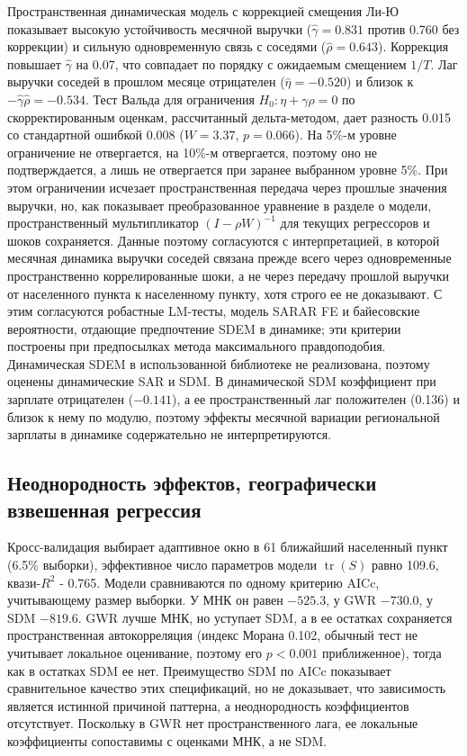 \documentclass[12pt, a4paper]{article}
\begin{document}
Пространственная динамическая модель с коррекцией смещения Ли-Ю показывает высокую устойчивость
месячной выручки ($\hat{\gamma} = 0.831$ против 0.760 без коррекции) и сильную одновременную
связь с соседями ($\hat{\rho} = 0.643$). Коррекция повышает $\hat{\gamma}$ на 0.07, что совпадает
по порядку с ожидаемым смещением $1/T$. Лаг выручки соседей в прошлом месяце отрицателен
($\hat{\eta} = -0.520$) и близок к $-\hat{\gamma} \hat{\rho} = -0.534$. Тест Вальда для
ограничения $H_0: \eta + \gamma \rho = 0$ по скорректированным оценкам, рассчитанный
дельта-методом, дает разность 0.015 со стандартной ошибкой 0.008 ($W = 3.37$, $p = 0.066$). На
5\%-м уровне ограничение не отвергается, на 10\%-м отвергается, поэтому оно не подтверждается, а
лишь не отвергается при заранее выбранном уровне 5\%. При этом ограничении исчезает пространственная
передача через прошлые значения выручки, но, как показывает преобразованное уравнение в разделе
о модели, пространственный мультипликатор $(I - \rho W)^{-1}$ для текущих регрессоров и шоков
сохраняется. Данные поэтому согласуются с интерпретацией, в которой месячная динамика выручки
соседей связана прежде всего через одновременные пространственно коррелированные шоки, а не через
передачу прошлой выручки от населенного пункта к населенному пункту, хотя строго ее не доказывают. С этим согласуются
робастные LM-тесты, модель SARAR FE и байесовские вероятности, отдающие предпочтение SDEM в
динамике; эти критерии построены при предпосылках метода максимального правдоподобия. Динамическая
SDEM в использованной библиотеке не реализована, поэтому оценены динамические SAR и SDM. В
динамической SDM коэффициент при зарплате отрицателен ($-0.141$), а ее пространственный лаг
положителен (0.136) и близок к нему по модулю, поэтому эффекты месячной вариации региональной
зарплаты в динамике содержательно не интерпретируются.

\subsection*{Неоднородность эффектов, географически взвешенная регрессия}

Кросс-валидация выбирает адаптивное окно в 61 ближайший населенный пункт (6.5\% выборки), эффективное число
параметров модели $\operatorname{tr}(S)$ равно 109.6, квази-$R^2$ - 0.765. Модели сравниваются по
одному критерию AICc, учитывающему размер выборки. У МНК он равен $-525.3$, у GWR $-730.0$, у SDM
$-819.6$. GWR лучше МНК, но уступает SDM, а в ее остатках сохраняется пространственная
автокорреляция (индекс Морана 0.102, обычный тест не учитывает локальное оценивание, поэтому его
$p < 0.001$ приближенное), тогда как в остатках SDM ее нет. Преимущество SDM по AICc показывает
сравнительное качество этих спецификаций, но не доказывает, что зависимость является истинной
причиной паттерна, а неоднородность коэффициентов отсутствует.
Поскольку в GWR нет пространственного лага, ее локальные коэффициенты сопоставимы с оценками МНК,
а не SDM.
\end{document}

